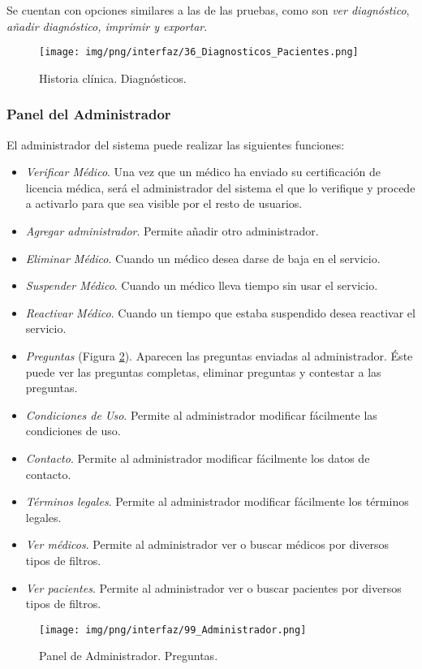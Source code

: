 \documentclass[a4paper,oneside,11pt]{book}
\begin{document}
			Se cuentan con opciones similares a las de las pruebas, como son \textit{ver diagnóstico}, \textit{añadir diagnóstico, imprimir y exportar}.
			
			
			\begin{figure}[H]
			  \centering
			    \texttt{[image: img/png/interfaz/36\_Diagnosticos\_Pacientes.png]}
			  \caption{Historia clínica. Diagnósticos.}
			  \label{fig:iu_diagnostico}
			\end{figure}
		
		
	\subsubsection{Panel del Administrador} %
		\label{sub:panel_administrador}
	
		El administrador del sistema puede realizar las siguientes funciones:
		
		\begin{itemize}
			\item \textit{Verificar Médico}. Una vez que un médico ha enviado su certificación de licencia médica, será el administrador del sistema el que lo verifique y procede a activarlo para que sea visible por el resto de usuarios.
			\item \textit{Agregar administrador}. Permite añadir otro administrador.
			\item \textit{Eliminar Médico}. Cuando un médico desea darse de baja en el servicio.
			\item \textit{Suspender Médico}. Cuando un médico lleva tiempo sin usar el servicio.
			\item \textit{Reactivar Médico}. Cuando un tiempo que estaba suspendido desea reactivar el servicio.
			\item \textit{Preguntas} (Figura \ref{fig:iu_admin_preguntas}). Aparecen las preguntas enviadas al administrador. Éste puede ver las preguntas completas, eliminar preguntas y contestar a las preguntas.
			\item \textit{Condiciones de Uso}. Permite al administrador modificar fácilmente las condiciones de uso.
			\item \textit{Contacto}. Permite al administrador modificar fácilmente los datos de contacto.
			\item \textit{Términos legales}. Permite al administrador modificar fácilmente los términos legales.
			\item \textit{Ver médicos}. Permite al administrador ver o buscar médicos por diversos tipos de filtros.
			\item \textit{Ver pacientes}. Permite al administrador ver o buscar pacientes por diversos tipos de filtros.
		\end{itemize}
	
		\begin{figure}[H]
		  \centering
		    \texttt{[image: img/png/interfaz/99\_Administrador.png]}
		  \caption{Panel de Administrador. Preguntas.}
		  \label{fig:iu_admin_preguntas}
		\end{figure}
	
\end{document}
